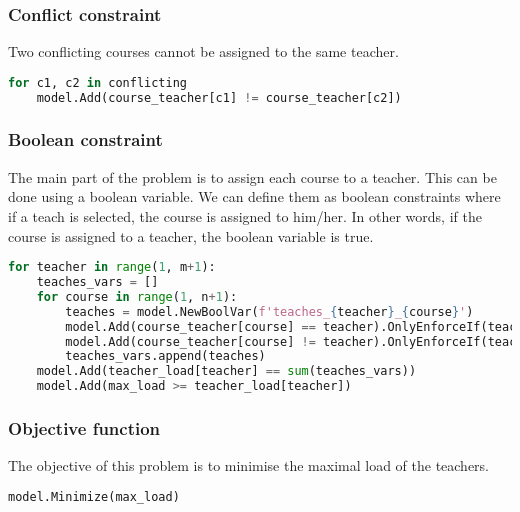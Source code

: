 \documentclass{article}
\begin{document}
\subsubsection{Conflict constraint}
Two conflicting courses cannot be assigned to the same teacher.
\begin{lstlisting}[language=Python]
for c1, c2 in conflicting
    model.Add(course_teacher[c1] != course_teacher[c2])
\end{lstlisting}

\subsubsection{Boolean constraint}
The main part of the problem is to assign each course to a teacher. This can be done using a boolean variable. We can define them as boolean constraints where if a teach is selected, the course is assigned to him/her. In other words, if the course is assigned to a teacher, the boolean variable is true.

\begin{lstlisting}[language=Python]
for teacher in range(1, m+1):
    teaches_vars = []
    for course in range(1, n+1):
        teaches = model.NewBoolVar(f'teaches_{teacher}_{course}')
        model.Add(course_teacher[course] == teacher).OnlyEnforceIf(teaches)
        model.Add(course_teacher[course] != teacher).OnlyEnforceIf(teaches.Not())
        teaches_vars.append(teaches)
    model.Add(teacher_load[teacher] == sum(teaches_vars))
    model.Add(max_load >= teacher_load[teacher])
\end{lstlisting}

\subsubsection{Objective function}
The objective of this problem is to minimise the maximal load of the teachers.
\begin{lstlisting}[language=Python]
model.Minimize(max_load)
\end{lstlisting}
\end{document}
